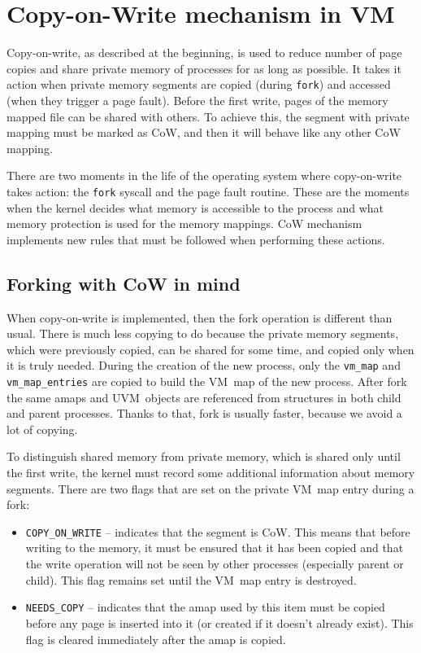 \section{Copy-on-Write mechanism in VM}

Copy-on-write, as described at the beginning, is used to reduce number of page copies and share private memory of processes for as long as possible.
It takes it action when private memory segments are copied (during {\tt fork}) and accessed (when they trigger a page fault).
Before the first write, pages of the memory mapped file can be shared with others.
To achieve this, the segment with private mapping must be marked as CoW, and then it will behave like any other CoW mapping.

There are two moments in the life of the operating system where copy-on-write takes action: the \texttt{fork} syscall and the page fault routine.
These are the moments when the kernel decides what memory is accessible to the process and what memory protection is used for the memory mappings.
CoW mechanism implements new rules that must be followed when performing these actions.

\subsection{Forking with CoW in mind}

When copy-on-write is implemented, then the fork operation is different than usual.
There is much less copying to do because the private memory segments, which were previously copied,
can be shared for some time, and copied only when it is truly needed.
During the creation of the new process, only the \texttt{vm_map} and \texttt{vm_map_entries} are copied to build the VM~map of the new process.
After fork the same amaps and UVM~objects are referenced from structures in both child and parent processes.
Thanks to that, fork is usually faster, because we avoid a lot of copying.

To distinguish shared memory from private memory, which is shared only until the first write,
the kernel must record some additional information about memory segments.
There are two flags that are set on the private VM~map entry during a fork:

\begin{itemize}
  \item \texttt{COPY_ON_WRITE} -- indicates that the segment is CoW.
    This means that before writing to the memory, it must be ensured that it has been copied
    and that the write operation will not be seen by other processes (especially parent or child).
    This flag remains set until the VM~map entry is destroyed.
  \item \texttt{NEEDS_COPY} -- indicates that the amap used by this item must be copied
    before any page is inserted into it (or created if it doesn't already exist).
    This flag is cleared immediately after the amap is copied.
\end{itemize}

